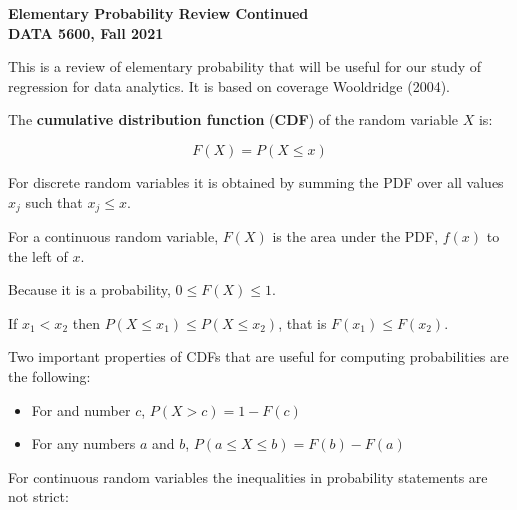 \documentclass[11pt]{article}
\begin{document}
\pagestyle{empty}

\textbf{Elementary Probability Review Continued} \\
\textbf{DATA 5600, Fall 2021} \\
\vspace{3.5mm}


This is a review of elementary probability that will be useful for our study of regression for data analytics. It is based on coverage Wooldridge (2004).

\vspace{3.5mm}

The \textbf{cumulative distribution function} (\textbf{CDF}) of the random variable $X$ is:

\begin{equation*}
F(X) = P(X \leq x)
\end{equation*}

\vspace{2mm}

For discrete random variables it is obtained by summing the PDF over all values $x_{j}$ such that $x_{j} \leq x$.

\vspace{2mm}

For a continuous random variable, $F(X)$ is the area under the PDF, $f(x)$ to the left of $x$.

\vspace{2mm}

Because it is a probability, $0 \leq F(X) \leq 1$.

\vspace{2mm}

If $x_{1} < x_{2}$ then $P(X \leq x_{1}) \leq P(X \leq x_{2})$, that is $F(x_{1}) \leq F(x_{2})$.

\vspace{2mm}

Two important properties of CDFs that are useful for computing probabilities are the following:

\begin{itemize}
 \item For and number $c$, $P(X > c) = 1 - F(c)$
 \item For any numbers $a$ and $b$, $P(a \leq X \leq b) = F(b) - F(a)$
\end{itemize}

\vspace{2mm}

For continuous random variables the inequalities in probability statements are not strict:
\end{document}
